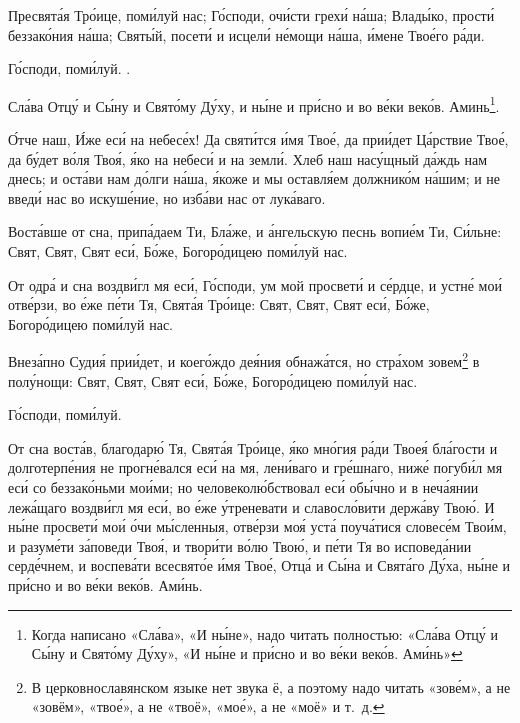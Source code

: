 \begin{mymulticols}

Пресвят\'{а}я Тр\'{о}ице, пом\'{и}луй нас; Г\'{о}споди, оч\'{и}сти грех\'{и} н\'{а}ша; Влад\'{ы}ко, прост\'{и} беззак\'{о}ния н\'{а}ша; Свят\'{ы}й, посет\'{и} и исцел\'{и} н\'{е}мощи н\'{а}ша, \'{и}мене Тво\'{е}го р\'{а}ди.

Г\'{о}споди, пом\'{и}луй. .

Сл\'{а}ва Отц\'{у} и С\'{ы}ну и Свят\'{о}му Д\'{у}ху, и н\'{ы}не и пр\'{и}сно и во в\'{е}ки век\'{о}в. Аминь\footnote{Когда написано «Сл\'{а}ва», «И н\'{ы}не», надо читать полностью: «Сл\'{а}ва Отц\'{у} и С\'{ы}ну и Свят\'{о}му Д\'{у}ху», «И н\'{ы}не и пр\'{и}сно и во в\'{е}ки век\'{о}в. Ам\'{и}нь»}.


\'{О}тче наш, \'{И}же ес\'{и} на небес\'{е}х! Да свят\'{и}тся \'{и}мя Тво\'{е}, да при\'{и}дет Ц\'{а}рствие Тво\'{е}, да б\'{у}дет в\'{о}ля Тво\'{я}, \'{я}ко на небес\'{и} и на земл\'{и}. Хлеб наш нас\'{у}щный д\'{а}ждь нам днесь; и ост\'{а}ви нам д\'{о}лги н\'{а}ша, \'{я}коже и мы оставл\'{я}ем должник\'{о}м н\'{а}шим; и не введ\'{и} нас во искуш\'{е}ние, но изб\'{а}ви нас от лук\'{а}ваго.


Вост\'{а}вше от сна, прип\'{а}даем Ти, Бл\'{а}же, и \'{а}нгельскую песнь вопи\'{е}м Ти, С\'{и}льне: Свят, Свят, Свят ес\'{и}, Б\'{о}же, Богор\'{о}дицею пом\'{и}луй нас.

\slavan

От одр\'{а} и сна воздв\'{и}гл мя ес\'{и}, Г\'{о}споди, ум мой просвет\'{и} и с\'{е}рдце, и устн\'{е} мо\'{и} отв\'{е}рзи, во \'{е}же п\'{е}ти Тя, Свят\'{а}я Тр\'{о}ице: Свят, Свят, Свят ес\'{и}, Б\'{о}же, Богор\'{о}дицею пом\'{и}луй нас.

\inynen

Внез\'{а}пно Суди\'{я} при\'{и}дет, и коег\'{о}ждо де\'{я}ния обнаж\'{а}тся, но стр\'{а}хом зовем\footnote{В церковнославянском языке нет звука ё, а поэтому надо читать «зов\'{е}м», а не «зовём», «тво\'{е}», а не «твоё», «мо\'{е}», а не «моё» и т.~д.} в пол\'{у}нощи: Свят, Свят, Свят ес\'{и}, Б\'{о}же, Богор\'{о}дицею пом\'{и}луй нас.

Г\'{о}споди, пом\'{и}луй. 


От сна вост\'{а}в, благодар\'{ю} Тя, Свят\'{а}я Тр\'{о}ице, \'{я}ко мн\'{о}гия р\'{а}ди Твое\'{я} бл\'{а}гости и долготерп\'{е}ния не прогн\'{е}вался ес\'{и} на мя, лен\'{и}ваго и гр\'{е}шнаго, ниж\'{е} погуб\'{и}л мя ес\'{и} со беззак\'{о}ньми мо\'{и}ми; но человекол\'{ю}бствовал ес\'{и} об\'{ы}чно и в неч\'{а}янии леж\'{а}щаго воздв\'{и}гл мя ес\'{и}, во \'{е}же \'{у}треневати и славосл\'{о}вити держ\'{а}ву Тво\'{ю}. И н\'{ы}не просвет\'{и} мо\'{и} \'{о}чи м\'{ы}сленныя, отв\'{е}рзи мо\'{я} уст\'{а} поуч\'{а}тися словес\'{е}м Тво\'{и}м, и разум\'{е}ти з\'{а}поведи Тво\'{я}, и твор\'{и}ти в\'{о}лю Тво\'{ю}, и п\'{е}ти Тя во исповед\'{а}нии серд\'{е}чнем, и воспев\'{а}ти всесвят\'{о}е \'{и}мя Тво\'{е}, Отц\'{а} и С\'{ы}на и Свят\'{а}го Д\'{у}ха, н\'{ы}не и пр\'{и}сно и во в\'{е}ки век\'{о}в. Ам\'{и}нь.


\end{mymulticols}
